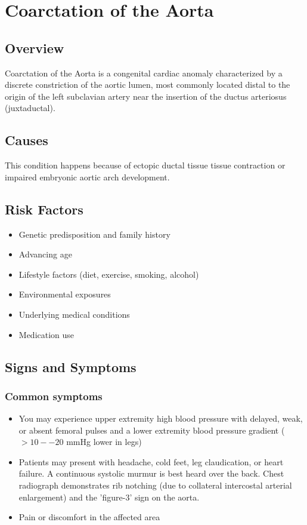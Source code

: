 \chapter{Coarctation of the Aorta}
\label{sec:Coarctation of the Aorta}

\section{Overview}
Coarctation of the Aorta is a congenital cardiac anomaly characterized by a discrete constriction of the aortic lumen, most commonly located distal to the origin of the left subclavian artery near the insertion of the ductus arteriosus (juxtaductal).
\section{Causes}
This condition happens because of ectopic ductal tissue tissue contraction or impaired embryonic aortic arch development.     
\section{Risk Factors}

\begin{itemize}[noitemsep]
  \item Genetic predisposition and family history
  \item Advancing age
  \item Lifestyle factors (diet, exercise, smoking, alcohol)
  \item Environmental exposures
  \item Underlying medical conditions
  \item Medication use
\end{itemize}
\section{Signs and Symptoms}

\subsection{Common symptoms}
\begin{itemize}[noitemsep]
  \item You may experience upper extremity high blood pressure with delayed, weak, or absent femoral pulses and a lower extremity blood pressure gradient ($>10--20$ mmHg lower in legs)
  \item Patients may present with headache, cold feet, leg claudication, or heart failure. A continuous systolic murmur is best heard over the back. Chest radiograph demonstrates rib notching (due to collateral intercostal arterial enlargement) and the 'figure-3' sign on the aorta.
  \item Pain or discomfort in the affected area
  \end{itemize}

